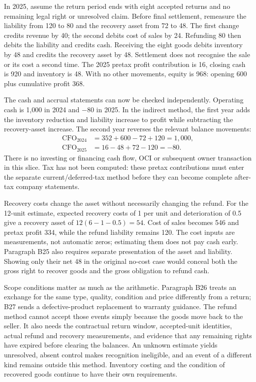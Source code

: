 In 2025, assume the return period ends with eight accepted returns and no
remaining legal right or unresolved claim. Before final settlement, remeasure
the liability from 120 to 80 and the recovery asset from 72 to 48. The first
change credits revenue by 40; the second debits cost of sales by 24. Refunding
80 then debits the liability and credits cash. Receiving the eight goods
debits inventory by 48 and credits the recovery asset by 48. Settlement does
not recognise the sale or its cost a second time. The 2025 pretax profit
contribution is 16, closing cash is 920 and inventory is 48. With no other
movements, equity is 968: opening 600 plus cumulative profit 368.

The cash and accrual statements can now be checked independently. Operating
cash is 1,000 in 2024 and $-80$ in 2025. In the indirect method, the first
year adds the inventory reduction and liability increase to profit while
subtracting the recovery-asset increase. The second year reverses the relevant
balance movements:
\begin{align*}
 \mathrm{CFO}_{2024}&=352+600-72+120=1{,}000,\\
 \mathrm{CFO}_{2025}&=16-48+72-120=-80.
\end{align*}
There is no investing or financing cash flow, OCI or subsequent owner
transaction in this slice. Tax has not been computed: these pretax
contributions must enter the separate current/deferred-tax method before they
can become complete after-tax company statements.

Recovery costs change the asset without necessarily changing the refund. For
the 12-unit estimate, expected recovery costs of 1 per unit and deterioration
of 0.5 give a recovery asset of $12(6-1-0.5)=54$. Cost of sales becomes 546
and pretax profit 334, while the refund liability remains 120. The cost inputs
are measurements, not automatic zeros; estimating them does not pay cash early.
Paragraph B25 also requires separate presentation of the asset and liability.
Showing only their net 48 in the original no-cost case would conceal both
the gross right to recover goods and the gross obligation to refund cash.

Scope conditions matter as much as the arithmetic. Paragraph B26 treats an
exchange for the same type, quality, condition and price differently from a
return; B27 sends a defective-product replacement to warranty guidance.
The refund method cannot accept those events simply because the goods move
back to the seller. It also needs the contractual return window, accepted-unit
identities, actual refund and recovery measurements, and evidence that any
remaining rights have expired before clearing the balances. An unknown
estimate yields unresolved, absent control makes recognition ineligible, and
an event of a different kind remains outside this method. Inventory costing
and the condition of recovered goods continue to have their own requirements.

